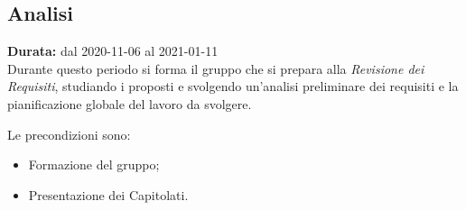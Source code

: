 \subsection{Analisi}
\label{analisi}
\textbf{Durata:} dal 2020-11-06 al 2021-01-11\\
Durante questo periodo si forma il gruppo che si prepara alla \textit{Revisione dei Requisiti}, studiando i  proposti e svolgendo un'analisi preliminare dei requisiti e la pianificazione globale del lavoro da svolgere. 

Le precondizioni sono:
\begin{itemize}
    \item Formazione del gruppo;
    \item Presentazione dei Capitolati.
\end{itemize}

